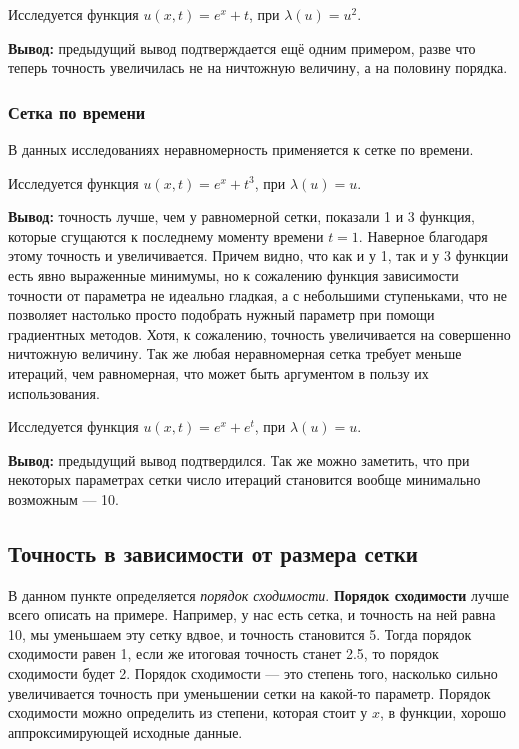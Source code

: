 
Исследуется функция $u(x, t) = e^x + t$, при $\lambda(u) = u^2$.


\textbf{Вывод:} предыдущий вывод подтверждается ещё одним примером, разве что теперь точность увеличилась не на ничтожную величину, а на половину порядка.

\subsubsection{Сетка по времени}

В данных исследованиях неравномерность применяется к сетке по времени.


Исследуется функция $u(x, t) = e^x + t^3$, при $\lambda(u) = u$.


\textbf{Вывод:} точность лучше, чем у равномерной сетки, показали 1 и 3 функция, которые сгущаются к последнему моменту времени $t=1$. Наверное  благодаря этому точность и увеличивается. Причем видно, что как и у 1, так и у 3 функции есть явно выраженные минимумы, но к сожалению функция зависимости точности от параметра не идеально гладкая, а с небольшими ступеньками, что не позволяет настолько просто подобрать нужный параметр при помощи градиентных методов. Хотя, к сожалению, точность увеличивается на совершенно ничтожную величину. Так же любая неравномерная сетка требует меньше итераций, чем равномерная, что может быть аргументом в пользу их использования.


Исследуется функция $u(x, t) = e^x + e^t$, при $\lambda(u) = u$.


\textbf{Вывод:} предыдущий вывод подтвердился. Так же можно заметить, что при некоторых параметрах сетки число итераций становится вообще минимально возможным --- 10.

\subsection{Точность в зависимости от размера сетки}

В данном пункте определяется \textit{порядок сходимости}. \textbf{Порядок сходимости} лучше всего описать на примере. Например, у нас есть сетка, и точность на ней равна 10, мы уменьшаем эту сетку вдвое, и точность становится 5. Тогда порядок сходимости равен 1, если же итоговая точность станет 2.5, то порядок сходимости будет 2. Порядок сходимости --- это степень того, насколько сильно увеличивается точность при уменьшении сетки на какой-то параметр. Порядок сходимости можно определить из степени, которая стоит у $x$, в функции, хорошо аппроксимирующей исходные данные.

